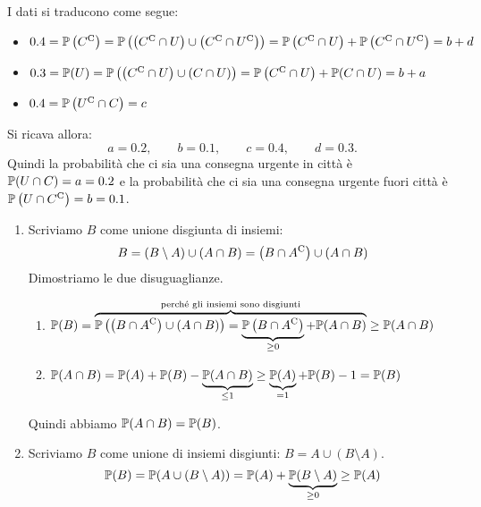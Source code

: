 I dati si traducono come segue:
\begin{itemize}
	\item $0.4=\mathbb{P}\left( C^{\mathrm{C}}\right) =\mathbb{P}\left(\left( C^{\mathrm{C}} \cap U\right) \cup \left( C^{\mathrm{C}} \cap U^{\mathrm{C}}\right)\right)=\mathbb{P}\left( C^{\mathrm{C}} \cap U\right) +\mathbb{P}\left( C^{\mathrm{C}} \cap U^{\mathrm{C}}\right)=b+d$
	\item $0.3=\mathbb{P}( U) =\mathbb{P}\left(\left( C^{\mathrm{C}} \cap U\right) \cup ( C\cap U)\right)=\mathbb{P}\left( C^{\mathrm{C}} \cap U\right) +\mathbb{P}( C\cap U)=b+a$
	\item $0.4=\mathbb{P}\left( U^{\mathrm{C}} \cap C\right) =c$
\end{itemize}

Si ricava allora:
\begin{equation*}
	a=0.2,\qquad b=0.1,\qquad c=0.4,\qquad d=0.3.
\end{equation*}
Quindi la probabilità che ci sia una consegna urgente in città è $\mathbb{P}(U\cap C) =a=0.2$ e la probabilità che ci sia una consegna urgente fuori città è $\mathbb{P}\left(U\cap C^{\mathrm{C}}\right) =b=0.1$.

\Soluzione

\begin{enumerate}
	\item Scriviamo $B$ come unione disgiunta di insiemi:
	\[
		B=(B\setminus A) \cup (A\cap B) =\left(B\cap A^{\mathrm{C}}\right) \cup (A\cap B)
	\]
	Dimostriamo le due disuguaglianze.
	\begin{enumerate}
		\item $\mathbb{P}(B) =\overbrace{\mathbb{P}\left(\left(B\cap A^{\mathrm{C}}\right) \cup (A\cap B)\right) =\underbrace{\mathbb{P}\left(B\cap A^{\mathrm{C}}\right)}_{\geq 0} +\mathbb{P}(A\cap B)}^{\text{perché gli insiemi sono disgiunti}} \geq \mathbb{P}(A\cap B)$
		\item $\mathbb{P}(A\cap B) =\mathbb{P}(A) +\mathbb{P}(B) -\underbrace{\mathbb{P}(A\cap B)}_{\leq 1} \geq \underbrace{\mathbb{P}(A)}_{=1} +\mathbb{P}(B) -1=\mathbb{P}(B)$
	\end{enumerate}
	Quindi abbiamo $\mathbb{P}(A\cap B) =\mathbb{P}(B)$.
	\item Scriviamo $B$ come unione di insiemi disgiunti: $B=A\cup (B\setminus A)$.
	\[
		\mathbb{P}(B) =\mathbb{P}(A\cup ( B\setminus A)) =\mathbb{P}(A) +\underbrace{\mathbb{P}(B\setminus A)}_{\geq 0} \geq \mathbb{P}(A)
	\]
\end{enumerate}

\Soluzione

